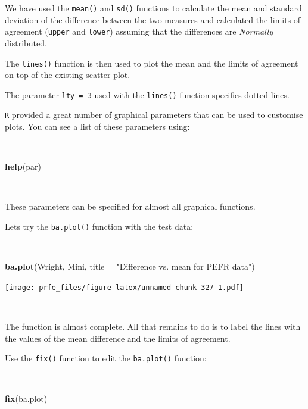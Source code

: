 \documentclass[12pt,a4paper]{book}
\newenvironment{Shaded}{\begin{snugshade}}{\end{snugshade}}
\newcommand{\KeywordTok}[1]{\textcolor[rgb]{0.13,0.29,0.53}{\textbf{#1}}}
\newcommand{\DataTypeTok}[1]{\textcolor[rgb]{0.13,0.29,0.53}{#1}}
\newcommand{\StringTok}[1]{\textcolor[rgb]{0.31,0.60,0.02}{#1}}
\newcommand{\NormalTok}[1]{#1}
\theoremstyle{definition}
\theoremstyle{definition}
\theoremstyle{definition}
\theoremstyle{remark}
\begin{document}
We have used the \texttt{mean()} and \texttt{sd()} functions to
calculate the mean and standard deviation of the difference between the
two measures and calculated the limits of agreement (\texttt{upper} and
\texttt{lower}) assuming that the differences are \emph{Normally}
distributed.

The \texttt{lines()} function is then used to plot the mean and the
limits of agreement on top of the existing scatter plot.

The parameter \texttt{lty\ =\ 3} used with the \texttt{lines()} function
specifies dotted lines.

\texttt{R} provided a great number of graphical parameters that can be
used to customise plots. You can see a list of these parameters using:

~

\begin{Shaded}
\begin{Highlighting}[]
\KeywordTok{help}\NormalTok{(par)}
\end{Highlighting}
\end{Shaded}

~

These parameters can be specified for almost all graphical functions.

Lets try the \texttt{ba.plot()} function with the test data:

~

\begin{Shaded}
\begin{Highlighting}[]
\KeywordTok{ba.plot}\NormalTok{(Wright, Mini, }\DataTypeTok{title =} \StringTok{"Difference vs. mean for PEFR data"}\NormalTok{)}
\end{Highlighting}
\end{Shaded}

\texttt{[image: prfe\_files/figure-latex/unnamed-chunk-327-1.pdf]}

~

The function is almost complete. All that remains to do is to label the
lines with the values of the mean difference and the limits of
agreement.

Use the \texttt{fix()} function to edit the \texttt{ba.plot()} function:

~

\begin{Shaded}
\begin{Highlighting}[]
\KeywordTok{fix}\NormalTok{(ba.plot)}
\end{Highlighting}
\end{Shaded}
\end{document}
